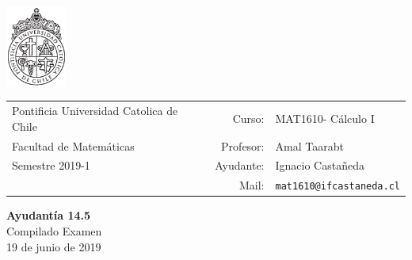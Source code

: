 \documentclass[12pt]{article}
\makeatletter
\newcommand{\ayudantia}{{\sc Ayudantía 14.5}}
\newcommand{\tituloayu}{Compilado Examen}
\newcommand{\fecha}{19 de junio de 2019}
\newcommand{\sigla}{MAT1610}
\newcommand{\nombre}{Cálculo I}
\newcommand{\profesor}{Amal Taarabt}
\newcommand{\ano}{2019}
\newcommand{\semestre}{1}
\newcommand{\mail}{mat1610@ifcastaneda.cl}
\makeatother
\begin{document}
\thispagestyle{empty}

\begin{minipage}{2cm}
	\includegraphics[width=2cm]{../../../../img/logo.pdf}
	\vspace{0.5cm}
\end{minipage}
\begin{minipage}{\linewidth}
	\begin{tabular}{lrl}
		{\scriptsize\sc Pontificia Universidad Catolica de Chile} & \hspace*{0.7in}Curso: &
		\sigla  - \nombre\\
		{\sc Facultad de Matemáticas}&
		Profesor: & \profesor \\
		{\sc Semestre \ano-\semestre} & Ayudante: & {Ignacio Castañeda}\\
		& {Mail:} & \texttt{\mail}
	\end{tabular}
\end{minipage}

\vspace{-10mm}
\begin{center}
	{\LARGE\bf \ayudantia}\\
	\vspace{0.1cm}
	{\tituloayu}\\
	\vspace{0.1cm}
	\fecha\\
	\vspace{0.4cm}
\end{center}
\end{document}

